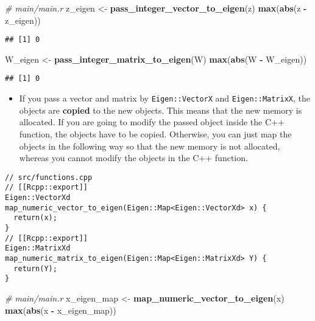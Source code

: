 \documentclass[
]{book}
\newenvironment{Shaded}{\begin{snugshade}}{\end{snugshade}}
\newcommand{\CommentTok}[1]{\textcolor[rgb]{0.56,0.35,0.01}{\textit{#1}}}
\newcommand{\FunctionTok}[1]{\textcolor[rgb]{0.13,0.29,0.53}{\textbf{#1}}}
\newcommand{\NormalTok}[1]{#1}
\newcommand{\OtherTok}[1]{\textcolor[rgb]{0.56,0.35,0.01}{#1}}
\newcommand{\SpecialCharTok}[1]{\textcolor[rgb]{0.81,0.36,0.00}{\textbf{#1}}}
\providecommand{\tightlist}{%
  \setlength{\itemsep}{0pt}\setlength{\parskip}{0pt}}
\begin{document}
\begin{Shaded}
\begin{Highlighting}[]
\CommentTok{\# main/main.r}
\NormalTok{z\_eigen }\OtherTok{\textless{}{-}} \FunctionTok{pass\_integer\_vector\_to\_eigen}\NormalTok{(z)}
\FunctionTok{max}\NormalTok{(}\FunctionTok{abs}\NormalTok{(z }\SpecialCharTok{{-}}\NormalTok{ z\_eigen))}
\end{Highlighting}
\end{Shaded}

\begin{verbatim}
## [1] 0
\end{verbatim}

\begin{Shaded}
\begin{Highlighting}[]
\NormalTok{W\_eigen }\OtherTok{\textless{}{-}} \FunctionTok{pass\_integer\_matrix\_to\_eigen}\NormalTok{(W)}
\FunctionTok{max}\NormalTok{(}\FunctionTok{abs}\NormalTok{(W }\SpecialCharTok{{-}}\NormalTok{ W\_eigen))}
\end{Highlighting}
\end{Shaded}

\begin{verbatim}
## [1] 0
\end{verbatim}

\begin{itemize}
\tightlist
\item
  If you pass a vector and matrix by \texttt{Eigen::VectorX} and \texttt{Eigen::MatrixX}, the objects are \textbf{copied} to the new objects. This means that the new memory is allocated. If you are going to modify the passed object inside the C++ function, the objects have to be copied. Otherwise, you can just map the objects in the following way so that the new memory is not allocated, whereas you cannot modify the objects in the C++ function.
\end{itemize}

\begin{verbatim}
// src/functions.cpp
// [[Rcpp::export]]
Eigen::VectorXd map_numeric_vector_to_eigen(Eigen::Map<Eigen::VectorXd> x) {
  return(x);
}
// [[Rcpp::export]]
Eigen::MatrixXd map_numeric_matrix_to_eigen(Eigen::Map<Eigen::MatrixXd> Y) {
  return(Y);
}
\end{verbatim}

\begin{Shaded}
\begin{Highlighting}[]
\CommentTok{\# main/main.r}
\NormalTok{x\_eigen\_map }\OtherTok{\textless{}{-}} \FunctionTok{map\_numeric\_vector\_to\_eigen}\NormalTok{(x)}
\FunctionTok{max}\NormalTok{(}\FunctionTok{abs}\NormalTok{(x }\SpecialCharTok{{-}}\NormalTok{ x\_eigen\_map))}
\end{Highlighting}
\end{Shaded}
\end{document}
